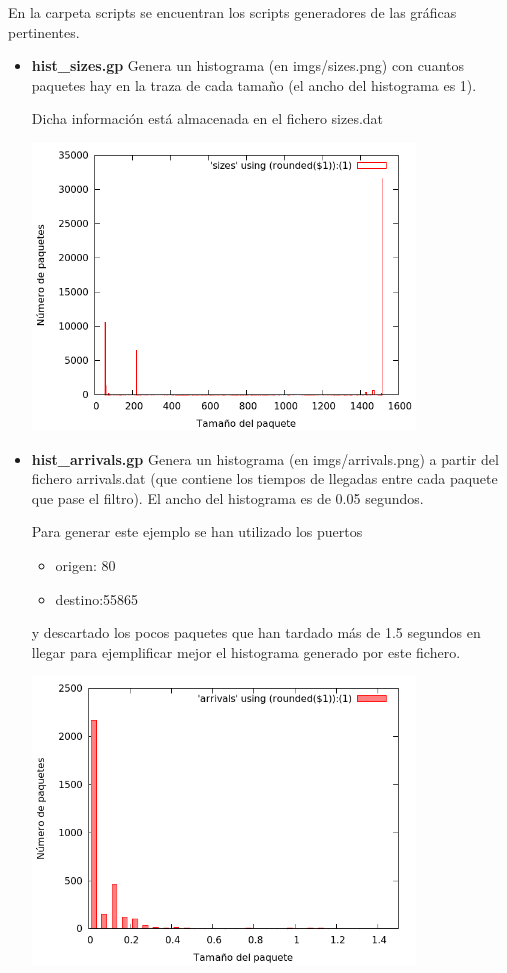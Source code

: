 \documentclass[nochap]{apuntes}
\begin{document}
En la carpeta scripts se encuentran los scripts generadores de las gráficas pertinentes. 
\begin{itemize}
	\item \textbf{hist\_sizes.gp} Genera un histograma (en imgs/sizes.png) con cuantos paquetes hay en la traza de cada tamaño (el ancho del histograma es 1). 

	Dicha información está almacenada en el fichero sizes.dat
	
	\begin{center}
	\includegraphics[width=0.8\textwidth]{imgs/Memoria/mem_sizes.png}
	\end{center}

	\item \textbf{hist\_arrivals.gp} Genera un histograma (en imgs/arrivals.png) a partir del fichero arrivals.dat (que contiene los tiempos de llegadas entre cada paquete que pase el filtro). El ancho del histograma es de 0.05 segundos.

	Para generar este ejemplo se han utilizado los puertos 

	\begin{itemize}
		\item origen: 80
		\item destino:55865
	\end{itemize}
	y descartado los pocos paquetes que han tardado más de 1.5 segundos en llegar para ejemplificar mejor el histograma generado por este fichero.
	\begin{center}
	\includegraphics[width=0.8\textwidth]{imgs/Memoria/mem_arrivals_port.png}
	\end{center}
\end{itemize}
\end{document}

